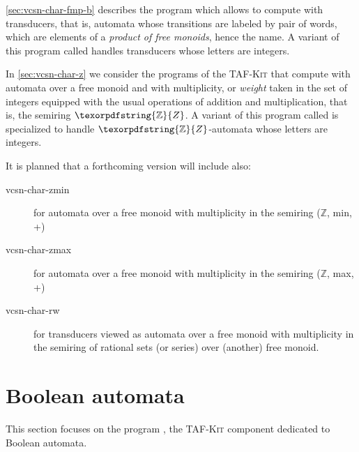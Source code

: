 \documentclass[a4paper]{report}
\renewcommand{\max}{\textrm{max}}
\renewcommand{\min}{\textrm{min}}
\newcommand{\Z}{\texorpdfstring{\ensuremath{\mathbb{Z}}}{Z}}
\newcommand{\Index}[1]{\index{#1}#1}
\newcommand{\tafkit}{\textsc{TAF-Kit}\xspace}
\begin{document}
\autoref{sec:vcsn-char-fmp-b} describes the program
 which allows to compute with transducers, that
is, automata whose transitions are labeled by pair of words, which are
elements of a \emph{product of free monoids}, hence the name.  A
variant of this program called  handles
transducers whose letters are integers.

In \autoref{sec:vcsn-char-z} we consider the programs of the \tafkit
that compute with automata over a free monoid and with multiplicity,
or \emph{weight} taken in the set of integers equipped with the usual
operations of addition and multiplication, that is, the semiring $\Z$.
A variant of this program called  is specialized
to handle $\Z$-automata whose letters are integers.


\medskip


It is planned that a forthcoming version will include also:

\begin{description}
\item[vcsn-char-zmin] for automata over a free monoid with multiplicity in
  the semiring (\Z, \min, +)

\item[vcsn-char-zmax] for automata over a free monoid with multiplicity in the
  semiring (\Z, \max, +)

\item[vcsn-char-rw] for transducers viewed as automata over a free
  monoid with multiplicity in the semiring of rational sets (or
  series) over (another) free monoid.
\end{description}

\newpage

\section{Boolean automata}
\label{sec:vcsn-char-b}

This section focuses on the program \Index{}, the
\tafkit component dedicated to Boolean automata.
\end{document}
